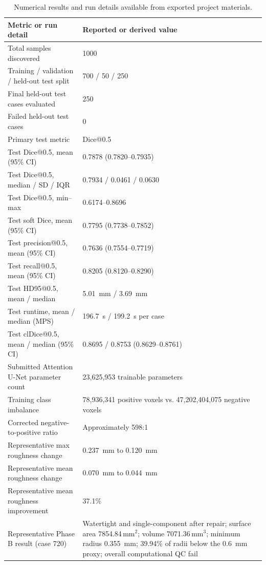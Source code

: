 \documentclass[anonymous]{iopjournal}
\begin{document}
\begin{table}[!t]
\centering
\caption{Numerical results and run details available from exported project materials.}
\label{tab:results}
\begin{threeparttable}
\footnotesize
\begin{tabularx}{0.92\textwidth}{L{0.42\textwidth}Y}
\toprule
\textbf{Metric or run detail} & \textbf{Reported or derived value} \\
\midrule
Total samples discovered & 1000 \\
Training / validation / held-out test split & 700 / 50 / 250 \\
Final held-out test cases evaluated & 250 \\
Failed held-out test cases & 0 \\
Primary test metric & Dice@0.5 \\
Test Dice@0.5, mean (95\% CI) & 0.7878 (0.7820--0.7935) \\
Test Dice@0.5, median / SD / IQR & 0.7934 / 0.0461 / 0.0630 \\
Test Dice@0.5, min--max & 0.6174--0.8696 \\
Test soft Dice, mean (95\% CI) & 0.7795 (0.7738--0.7852) \\
Test precision@0.5, mean (95\% CI) & 0.7636 (0.7554--0.7719) \\
Test recall@0.5, mean (95\% CI) & 0.8205 (0.8120--0.8290) \\
Test HD95@0.5, mean / median & \SI{5.01}{mm} / \SI{3.69}{mm} \\
Test runtime, mean / median (MPS) & \SI{196.7}{s} / \SI{199.2}{s} per case \\
Test clDice@0.5, mean / median (95\% CI) & 0.8695 / 0.8753 (0.8629--0.8761) \\
Submitted Attention U-Net parameter count & 23,625,953 trainable parameters \\
Training class imbalance & 78,936,341 positive voxels vs. 47,202,404,075 negative voxels \\
Corrected negative-to-positive ratio & Approximately 598:1 \\
Representative max roughness change & \SI{0.237}{mm} to \SI{0.120}{mm} \\
Representative mean roughness change & \SI{0.070}{mm} to \SI{0.044}{mm} \\
Representative mean roughness improvement & 37.1\% \\
Representative Phase B result (case 720) & Watertight and single-component after repair; surface area 7854.84\,mm$^2$; volume 7071.36\,mm$^3$; minimum radius \SI{0.355}{mm}; 39.94\% of radii below the \SI{0.6}{mm} proxy; overall computational QC fail \\

\end{tabularx}
\end{threeparttable}
\end{table}
\end{document}
